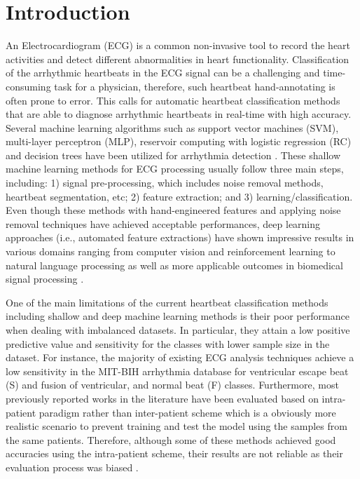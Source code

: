 \documentclass{article}
\begin{document}
\section{Introduction}
\label{sec:intro}
An Electrocardiogram (ECG) is a common non-invasive tool to record the heart activities and detect different abnormalities in heart functionality. Classification of the arrhythmic heartbeats in the ECG signal can be a challenging and time-consuming task for a physician, therefore, such heartbeat hand-annotating is often prone to error. This calls for automatic heartbeat classification methods that are able to diagnose arrhythmic heartbeats in real-time with high accuracy.
Several machine learning algorithms such as support vector machines (SVM), multi-layer perceptron (MLP), reservoir computing with logistic regression (RC) and decision trees have been utilized for arrhythmia detection \cite{ye2010arrhythmia,escalona2015electrocardiogram,zaeri2018feature,yu2008integration,afghah2015shapley}. These shallow machine learning methods for ECG processing usually follow three main steps, including: 1) signal pre-processing, which includes noise removal methods, heartbeat segmentation, etc; 2) feature extraction; and 3) learning/classification. Even though these methods with hand-engineered features and applying noise removal techniques have achieved acceptable performances, deep learning approaches (i.e., automated feature extractions) have shown impressive  results in various domains ranging from computer vision and reinforcement learning to natural language processing \cite{sutskever2014sequence,mousavi2016learning,mousavi2016deep} as well as more applicable outcomes in biomedical signal processing \cite{kachuee2018ecg,acharya2017deep}.         

One of the main limitations of the current heartbeat classification methods including shallow and deep machine learning methods is their poor performance when dealing with imbalanced datasets. In particular, they attain a low positive predictive value and sensitivity for the classes with lower sample size in the dataset. For instance, the majority of existing ECG analysis techniques achieve a low sensitivity in the MIT-BIH arrhythmia database for ventricular escape beat (S) and fusion of ventricular, and normal beat (F) classes. Furthermore, most previously reported works in the literature have been evaluated based on intra-patient paradigm rather than inter-patient scheme which is a obviously more realistic scenario to prevent training and test the model using the samples from the same patients. Therefore, although some of these methods achieved good accuracies using the intra-patient scheme, their results are not reliable as their evaluation process was biased \cite{de2004automatic}. 
\end{document}
